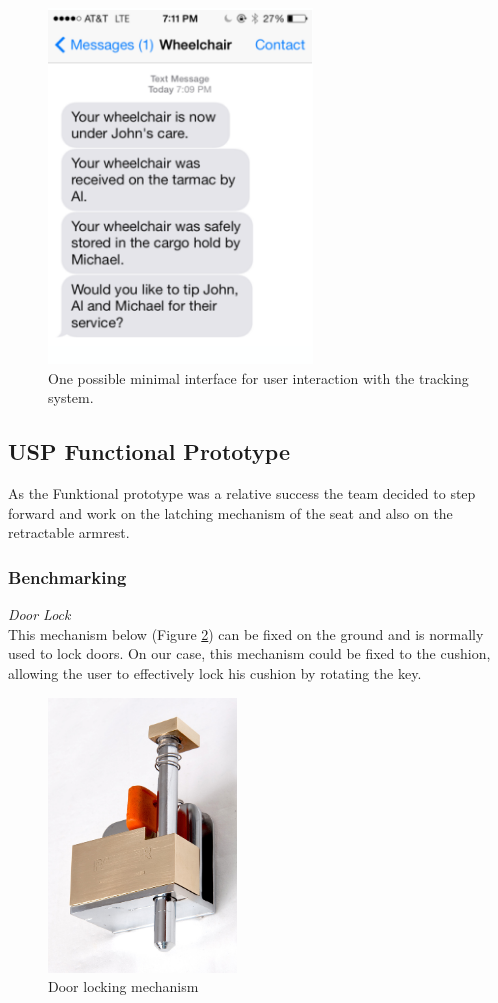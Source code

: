 \begin{figure}[h]
  \centering
     \includegraphics[width=7cm]{images/tips.png}
   \caption{One possible minimal interface for user interaction with the tracking system.}
  \label{fig:tips}
\end{figure}

\subsection{USP Functional Prototype}

As the Funktional prototype was a relative success the team decided to step forward and work on the latching mechanism of the seat and also on the retractable armrest.

\subsubsection{Benchmarking}

\noindent\emph{Door Lock}\\
This mechanism below (Figure \ref{fig:door_locking}) can be fixed on the ground and is normally used to lock doors. On our case, this mechanism could be fixed to the cushion, allowing the user to effectively lock his cushion by rotating the key.\\

\begin{figure}[h]
\centering
\includegraphics[width=5cm]{brazil_images/image043.png}
\caption{Door locking mechanism}
\label{fig:door_locking}
\end{figure}

